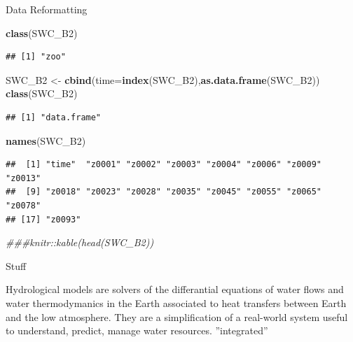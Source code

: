 \documentclass[ignorenonframetext,]{beamer}
\newenvironment{Shaded}{\begin{snugshade}}{\end{snugshade}}
\newcommand{\CommentTok}[1]{\textcolor[rgb]{0.56,0.35,0.01}{\textit{#1}}}
\newcommand{\DataTypeTok}[1]{\textcolor[rgb]{0.13,0.29,0.53}{#1}}
\newcommand{\KeywordTok}[1]{\textcolor[rgb]{0.13,0.29,0.53}{\textbf{#1}}}
\newcommand{\NormalTok}[1]{#1}
\newcommand{\StringTok}[1]{\textcolor[rgb]{0.31,0.60,0.02}{#1}}
\begin{document}
\begin{frame}[fragile]{Data Reformatting}
\protect\hypertarget{data-reformatting}{}

\begin{Shaded}
\begin{Highlighting}[]
\KeywordTok{class}\NormalTok{(SWC_B2)}
\end{Highlighting}
\end{Shaded}

\begin{verbatim}
## [1] "zoo"
\end{verbatim}

\begin{Shaded}
\begin{Highlighting}[]
\NormalTok{SWC_B2 <-}\StringTok{ }\KeywordTok{cbind}\NormalTok{(}\DataTypeTok{time=}\KeywordTok{index}\NormalTok{(SWC_B2),}\KeywordTok{as.data.frame}\NormalTok{(SWC_B2))}
\KeywordTok{class}\NormalTok{(SWC_B2)}
\end{Highlighting}
\end{Shaded}

\begin{verbatim}
## [1] "data.frame"
\end{verbatim}

\begin{Shaded}
\begin{Highlighting}[]
\KeywordTok{names}\NormalTok{(SWC_B2)}
\end{Highlighting}
\end{Shaded}

\begin{verbatim}
##  [1] "time"  "z0001" "z0002" "z0003" "z0004" "z0006" "z0009" "z0013"
##  [9] "z0018" "z0023" "z0028" "z0035" "z0045" "z0055" "z0065" "z0078"
## [17] "z0093"
\end{verbatim}

\begin{Shaded}
\begin{Highlighting}[]
\CommentTok{###knitr::kable(head(SWC_B2))}
\end{Highlighting}
\end{Shaded}

\end{frame}

\begin{frame}{Stuff}
\protect\hypertarget{stuff}{}

Hydrological models are solvers of the differantial equations of water
flows and water thermodymanics in the Earth associated to heat transfers
between Earth and the low atmosphere. They are a simplification of a
real-world system useful to understand, predict, manage water resources.
''integrated''

\end{frame}
\end{document}
